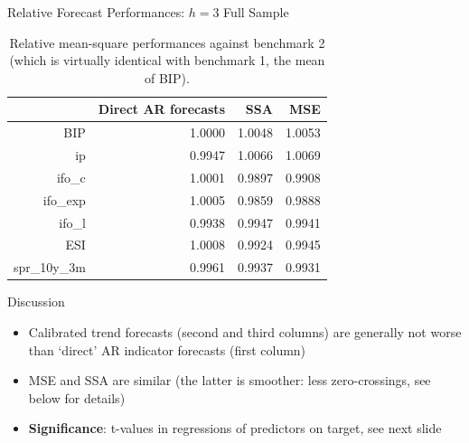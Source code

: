 \documentclass{beamer}
\begin{document}
\begin{frame} {Relative Forecast Performances: $h=3$ Full Sample}\label{rmse3}

\begin{table}[ht]
\centering
\begin{tabular}{rrrr}
  \hline
 & Direct AR forecasts & SSA & MSE \\ 
  \hline
BIP & 1.0000 & 1.0048 & 1.0053 \\ 
  ip & 0.9947 & 1.0066 & 1.0069 \\ 
  ifo\_c & 1.0001 & 0.9897 & 0.9908 \\ 
  ifo\_exp & 1.0005 & 0.9859 & 0.9888 \\ 
  ifo\_l & 0.9938 & 0.9947 & 0.9941 \\ 
  ESI & 1.0008 & 0.9924 & 0.9945 \\ 
  spr\_10y\_3m & 0.9961 & 0.9937 & 0.9931 \\ 
   \hline
\end{tabular}
\caption{Relative mean-square performances against benchmark 2 (which is virtually identical with benchmark 1, the mean of BIP).} 
\label{perf_var1}
\end{table}\end{frame}












\begin{frame} {Discussion}
\begin{itemize}
\item Calibrated trend forecasts (second and third columns) are generally not worse than `direct' AR indicator forecasts (first column)
\item MSE and SSA are similar (the latter is smoother: less zero-crossings, see below for details)

\item \textbf{Significance}: t-values in regressions of predictors on target, see next slide

\end{itemize}

\end{frame}
\end{document}
